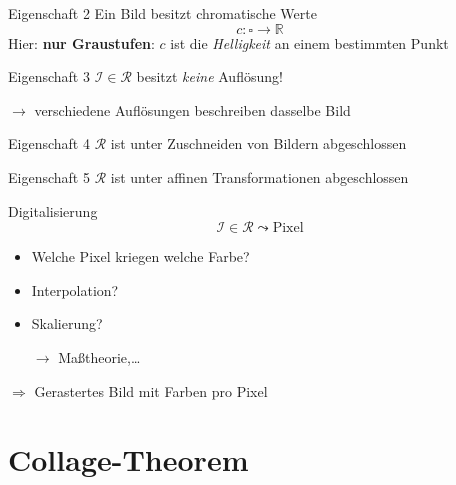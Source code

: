 \documentclass[10pt]{beamer}
\newcommand{\R}{\mathbb{R}}
\begin{document}
\begin{frame}{Eigenschaft 2}
  Ein Bild besitzt \alert{chromatische Werte}
  \begin{equation*}
    c: \square \to \R
  \end{equation*}
  Hier: \textbf{nur Graustufen}: \( c \) ist die \emph{Helligkeit} an einem bestimmten Punkt

\end{frame}

\begin{frame}{Eigenschaft 3}
  \( \mathcal{I} \in \mathcal{R} \) besitzt \emph{keine} Auflösung!

  \( \to \) verschiedene Auflösungen beschreiben dasselbe Bild

\end{frame}

\begin{frame}{Eigenschaft 4}
  \( \mathcal{R} \) ist unter Zuschneiden von Bildern abgeschlossen

\end{frame}

\begin{frame}{Eigenschaft 5}
  \( \mathcal{R} \) ist unter affinen Transformationen abgeschlossen

\end{frame}

\begin{frame}{Digitalisierung}
  \begin{equation*}
    \mathcal{I} \in \mathcal{R} \leadsto \text{Pixel}
  \end{equation*}
  \begin{itemize}
    \item Welche Pixel kriegen welche Farbe?
    \item Interpolation?
    \item Skalierung?
    \item[\( \to \)] Maßtheorie,\dots
  \end{itemize}


  \( \Rightarrow \) Gerastertes Bild mit Farben pro Pixel
\end{frame}

\section{Collage-Theorem}
\end{document}
